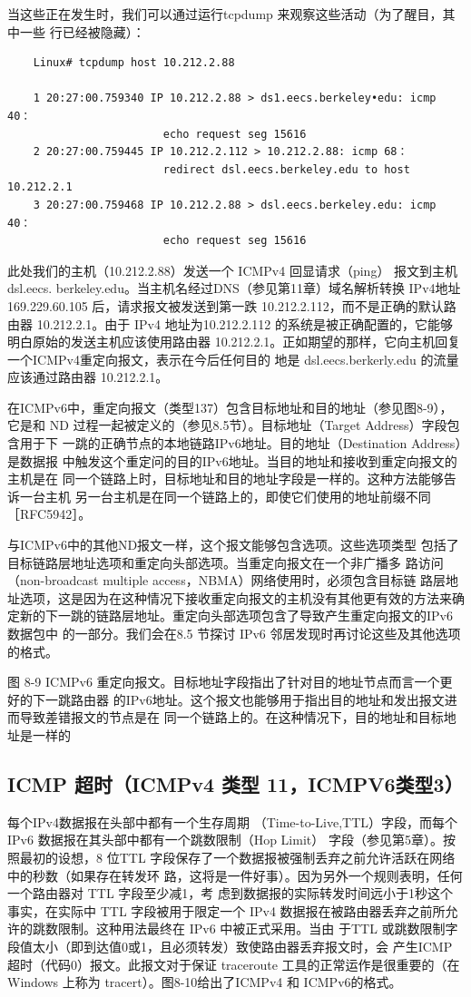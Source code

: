 当这些正在发生时，我们可以通过运行tcpdump 来观察这些活动（为了醒目，其中一些
行已经被隐藏）：

\begin{verbatim}
	Linux# tcpdump host 10.212.2.88

	1 20:27:00.759340 IP 10.212.2.88 > ds1.eecs.berkeley•edu: icmp 40：
						echo request seg 15616
	2 20:27:00.759445 IP 10.212.2.112 > 10.212.2.88: icmp 68：
						redirect dsl.eecs.berkeley.edu to host 10.212.2.1
	3 20:27:00.759468 IP 10.212.2.88 > dsl.eecs.berkeley.edu: icmp 40：
						echo request seg 15616
\end{verbatim}

此处我们的主机（10.212.2.88）发送一个 ICMPv4 回显请求（ping） 报文到主机 dsl.eecs.
berkeley.edu。当主机名经过DNS（参见第11章）域名解析转换 IPv4地址169.229.60.105
后，请求报文被发送到第一跌 10.212.2.112，而不是正确的默认路由器 10.212.2.1。由于 IPv4
地址为10.212.2.112 的系统是被正确配置的，它能够明白原始的发送主机应该使用路由器
10.212.2.1。正如期望的那样，它向主机回复一个ICMPv4重定向报文，表示在今后任何目的
地是 dsl.eecs.berkerly.edu 的流量应该通过路由器 10.212.2.1。

在ICMPv6中，重定向报文（类型137）包含目标地址和目的地址（参见图8-9），它是和
ND 过程一起被定义的（参见8.5节）。目标地址（Target Address）字段包含用于下
一跳的正确节点的本地链路IPv6地址。目的地址（Destination Address）是数据报
中触发这个重定问的目的IPv6地址。当目的地址和接收到重定向报文的主机是在
同一个链路上时，目标地址和目的地址字段是一样的。这种方法能够告诉一台主机
另一台主机是在同一个链路上的，即使它们使用的地址前缀不同［RFC5942］。

与ICMPv6中的其他ND报文一样，这个报文能够包含选项。这些选项类型
包括了目标链路层地址选项和重定向头部选项。当重定向报文在一个非广播多
路访问 （non-broadcast multiple access，NBMA）网络使用时，必须包含目标链
路层地址选项，这是因为在这种情况下接收重定向报文的主机没有其他更有效的方法来确
定新的下一跳的链路层地址。重定向头部选项包含了导致产生重定向报文的IPv6数据包中
的一部分。我们会在8.5 节探讨 IPv6 邻居发现时再讨论这些及其他选项的格式。

图 8-9	ICMPv6 重定向报文。目标地址字段指出了针对目的地址节点而言一个更好的下一跳路由器
的IPv6地址。这个报文也能够用于指出目的地址和发出报文进而导致差错报文的节点是在
同一个链路上的。在这种情况下，目的地址和目标地址是一样的

\subsection{ICMP 超时（ICMPv4 类型 11，ICMPV6类型3）}
每个IPv4数据报在头部中都有一个生存周期 （Time-to-Live,TTL）字段，而每个IPv6
数据报在其头部中都有一个跳数限制（Hop Limit） 字段（参见第5章）。按照最初的设想，8
位TTL 字段保存了一个数据报被强制丢弃之前允许活跃在网络中的秒数（如果存在转发环
路，这将是一件好事）。因为另外一个规则表明，任何一个路由器对 TTL 字段至少减1，考
虑到数据报的实际转发时间远小于1秒这个事实，在实际中 TTL 字段被用于限定一个 IPv4
数据报在被路由器丢弃之前所允许的跳数限制。这种用法最终在 IPv6 中被正式采用。当由
于TTL 或跳数限制字段值太小（即到达值0或1，且必须转发）致使路由器丢弃报文时，会
产生ICMP超时（代码0）报文。此报文对于保证 traceroute 工具的正常运作是很重要的（在
Windows 上称为 tracert）。图8-10给出了ICMPv4 和 ICMPv6的格式。


